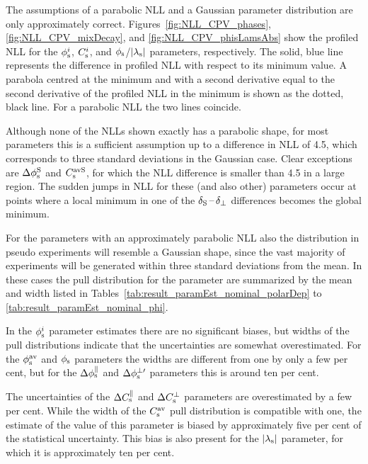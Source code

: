 The assumptions of a parabolic NLL and a Gaussian parameter distribution are only approximately correct. Figures~\ref{fig:NLL_CPV_phases},
\ref{fig:NLL_CPV_mixDecay}, and \ref{fig:NLL_CPV_phisLamsAbs} show the profiled NLL for the $\phi_\text{s}^{i}$, $C_\text{s}^{i}$, and $\phi_\text{s}$/$|{\lambda_{\text{s}}}|$
parameters, respectively. The solid, blue line represents the difference in profiled NLL with respect to its minimum value. A parabola
centred at the minimum and with a second derivative equal to the second derivative of the profiled NLL in the minimum is shown as the
dotted, black line. For a parabolic NLL the two lines coincide.

Although none of the NLLs shown exactly has a parabolic shape, for most parameters this is a sufficient assumption up to a difference in
NLL of 4.5, which corresponds to three standard deviations in the Gaussian case. Clear exceptions are $\Delta\phi_\text{s}^{\text{S}}$ and $C_\text{s}^\text{avS}$, for which
the NLL difference is smaller than 4.5 in a large region. The sudden jumps in NLL for these (and also other) parameters occur at points
where a local minimum in one of the $\delta_{\text{S}}\,\text{--}\,\delta_{\perp}$ differences becomes the global minimum.

For the parameters with an approximately parabolic NLL also the distribution in pseudo experiments will resemble a Gaussian shape, since
the vast majority of experiments will be generated within three standard deviations from the mean. In these cases the pull distribution for
the parameter are summarized by the mean and width listed in Tables~\ref{tab:result_paramEst_nominal_polarDep} to
\ref{tab:result_paramEst_nominal_phi}.

In the $\phi_\text{s}^{i}$ parameter estimates there are no significant biases, but widths of the pull distributions indicate that the uncertainties
are somewhat overestimated. For the $\phi_\text{s}^{\text{av}}$ and $\phi_\text{s}$ parameters the widths are different from one by only a few per cent, but for the
$\Delta\phi_\text{s}^{\parallel}$ and $\Delta\phi_\text{s}^{\perp\prime}$ parameters this is around ten per cent.

The uncertainties of the $\Delta C_\text{s}^\parallel$ and $\Delta C_\text{s}^\perp$ parameters are overestimated by a few per cent. While the width of the $C_\text{s}^\text{av}$ pull
distribution is compatible with one, the estimate of the value of this parameter is biased by approximately five per cent of the
statistical uncertainty. This bias is also present for the $|{\lambda_{\text{s}}}|$ parameter, for which it is approximately ten per cent.

